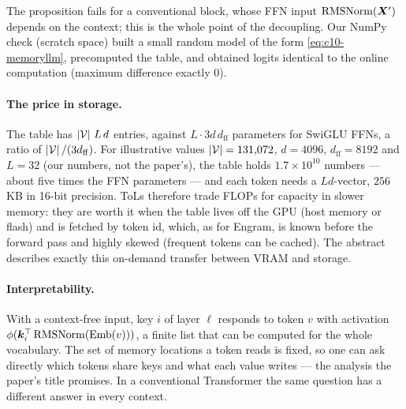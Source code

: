 The proposition fails for a conventional block, whose FFN input $\operatorname{RMSNorm}(\bm{X}')$ depends on the
context; this is the whole point of the decoupling. Our NumPy check (scratch space) built a small
random model of the form \eqref{eq:c10-memoryllm}, precomputed the table, and obtained logits
identical to the online computation (maximum difference exactly 0).

\paragraph{The price in storage.} The table has $\left\lvert \mathcal{V}\right\rvert\, L\, d$ entries, against
$L \cdot 3 d\, d_{\mathrm{ff}}$ parameters for SwiGLU FFNs, a ratio of
$\left\lvert \mathcal{V}\right\rvert/(3 d_{\mathrm{ff}})$. For illustrative values $\left\lvert \mathcal{V}\right\rvert = 131{,}072$,
$d = 4096$, $d_{\mathrm{ff}} = 8192$ and $L = 32$ (our numbers, not the paper's), the table holds
$1.7 \times 10^{10}$ numbers --- about five times the FFN parameters --- and each token needs a
$L d$-vector, $256$\,KB in 16-bit precision. ToLs therefore trade FLOPs for capacity in slower
memory: they are worth it when the table lives off the GPU (host memory or flash) and is fetched by
token id, which, as for Engram, is known before the forward pass and highly skewed (frequent
tokens can be cached). The abstract describes exactly this on-demand transfer between VRAM and
storage.

\paragraph{Interpretability.} With a context-free input, key $i$ of layer $\ell$ responds to token
$v$ with activation $\phi(\bm{k}_i^{\top}\operatorname{RMSNorm}(\mathrm{Emb}(v)))$, a finite list that can be computed
for the whole vocabulary. The set of memory locations a token reads is fixed, so one can ask
directly which tokens share keys and what each value writes --- the analysis the paper's title
promises. In a conventional Transformer the same question has a different answer in every context.

